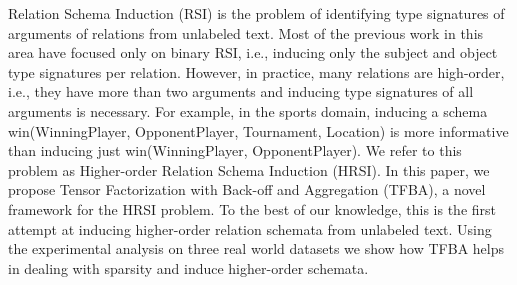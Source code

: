 Relation Schema Induction (RSI) is the problem of identifying type signatures of arguments of relations from unlabeled text. Most of the previous work in this area have focused only on binary RSI, i.e., inducing only the subject and object type signatures per relation. However, in practice, many relations are high-order, i.e., they have more than two arguments and inducing type signatures of all arguments is necessary. For example, in the sports domain, inducing a schema win(WinningPlayer, OpponentPlayer, Tournament, Location) is more informative than inducing just win(WinningPlayer, OpponentPlayer). We refer to this problem as Higher-order Relation Schema Induction (HRSI). In this paper, we propose Tensor Factorization with Back-off and Aggregation (TFBA), a novel framework for the HRSI problem. To the best of our knowledge, this is the first attempt at inducing higher-order relation schemata from unlabeled text. Using the experimental analysis on three real world datasets we show how TFBA helps in dealing with sparsity and induce higher-order schemata.
